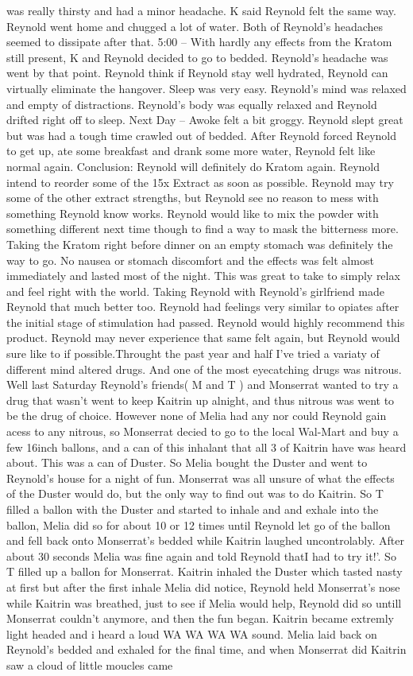 \documentclass[12pt]{book}
\begin{document}
was really thirsty and had a minor headache. K said Reynold felt the same way. Reynold went home and chugged a lot of water. Both of Reynold's headaches seemed to dissipate after that. 5:00 -- With hardly any effects from the Kratom still present, K and Reynold decided to go to bedded. Reynold's headache was went by that point. Reynold think if Reynold stay well hydrated, Reynold can virtually eliminate the hangover. Sleep was very easy. Reynold's mind was relaxed and empty of distractions. Reynold's body was equally relaxed and Reynold drifted right off to sleep. Next Day -- Awoke felt a bit groggy. Reynold slept great but was had a tough time crawled out of bedded. After Reynold forced Reynold to get up, ate some breakfast and drank some more water, Reynold felt like normal again. Conclusion: Reynold will definitely do Kratom again. Reynold intend to reorder some of the 15x Extract as soon as possible. Reynold may try some of the other extract strengths, but Reynold see no reason to mess with something Reynold know works. Reynold would like to mix the powder with something different next time though to find a way to mask the bitterness more. Taking the Kratom right before dinner on an empty stomach was definitely the way to go. No nausea or stomach discomfort and the effects was felt almost immediately and lasted most of the night. This was great to take to simply relax and feel right with the world. Taking Reynold with Reynold's girlfriend made Reynold that much better too. Reynold had feelings very similar to opiates after the initial stage of stimulation had passed. Reynold would highly recommend this product. Reynold may never experience that same felt again, but Reynold would sure like to if possible.Throught the past year and half I've tried a variaty of different mind altered drugs. And one of the most eyecatching drugs was nitrous. Well last Saturday Reynold's friends( M and T  ) and Monserrat wanted to try a drug that wasn't went to keep Kaitrin up alnight, and thus nitrous was went to be the drug of choice. However none of Melia had any nor could Reynold gain acess to any nitrous, so Monserrat decied to go to the local Wal-Mart and buy a few 16inch ballons, and a can of this inhalant that all 3 of Kaitrin have was heard about. This was a can of Duster. So Melia bought the Duster and went to Reynold's house for a night of fun. Monserrat was all unsure of what the effects of the Duster would do, but the only way to find out was to do Kaitrin. So T filled a ballon with the Duster and started to inhale and and exhale into the ballon, Melia did so for about 10 or 12 times until Reynold let go of the ballon and fell back onto Monserrat's bedded while Kaitrin laughed uncontrolably. After about 30 seconds Melia was fine again and told Reynold thatI had to try it!'. So T filled up a ballon for Monserrat. Kaitrin inhaled the Duster which tasted nasty at first but after the first inhale Melia did notice, Reynold held Monserrat's nose while Kaitrin was breathed, just to see if Melia would help, Reynold did so untill Monserrat couldn't anymore, and then the fun began. Kaitrin became extremly light headed and i heard a loud WA WA WA WA sound. Melia laid back on Reynold's bedded and exhaled for the final time, and when Monserrat did Kaitrin saw a cloud of little moucles came 
\end{document}
